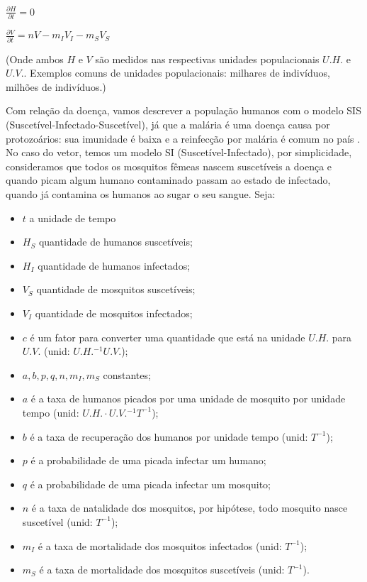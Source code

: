 \documentclass[
	12pt,				%
	openright,			%
	twoside,			%
	a4paper,			%
	english,			%
	french,				%
	spanish,			%
	brazil				%
	]{abntex2}
\begin{document}
$\frac{\partial H}{\partial t} = 0 $ 


$ \frac{\partial V}{\partial t}= nV -m_IV_I-m_SV_S$

(Onde ambos $H$ e $V$ são medidos nas respectivas unidades populacionais $U.H.$ e $U.V.$. Exemplos comuns de unidades populacionais: milhares de indivíduos, milhões de indivíduos.)

Com relação da doença, vamos descrever a população humanos com o modelo SIS (Suscetível-Infectado-Suscetível), já que a malária é uma doença causa por protozoários: sua imunidade é baixa e a reinfecção por malária é comum no país \cite{SUS}. No caso do vetor, temos um modelo SI (Suscetível-Infectado), por simplicidade, consideramos que todos os mosquitos fêmeas nascem suscetíveis a doença e quando picam algum humano contaminado passam ao estado de infectado, quando já contamina os humanos ao sugar o seu sangue. Seja:

\begin{itemize}
    \item $t$ a unidade de tempo
    \item $H_S$ quantidade de humanos suscetíveis;
    \item $H_I$ quantidade de humanos infectados;
    \item $V_S$ quantidade de mosquitos suscetíveis;
    \item $V_I$ quantidade de mosquitos infectados;
    \item $c$ é um fator para converter uma quantidade que está na unidade $U.H.$ para $U.V.$ (unid: $U.H.^{-1}U.V.$);
    \item $a,b,p,q,n,m_I,m_S$ constantes;
    \item $a$ é a taxa de humanos picados por uma unidade de mosquito por unidade tempo (unid: $U.H.\cdot U.V.^{-1}T^{-1}$);
    \item $b$ é a taxa de recuperação dos humanos por unidade tempo (unid: $T^{-1}$);
    \item $p$ é a probabilidade de uma picada infectar um humano;
    \item $q$ é a probabilidade de uma picada infectar um mosquito;
    \item $n$ é a taxa de natalidade dos mosquitos, por hipótese, todo mosquito nasce suscetível (unid: $T^{-1}$);
    \item $m_I$ é a taxa de mortalidade dos mosquitos infectados (unid: $T^{-1}$);
    \item $m_S$ é a taxa de mortalidade dos mosquitos suscetíveis (unid: $T^{-1}$).
\end{itemize}
\end{document}
